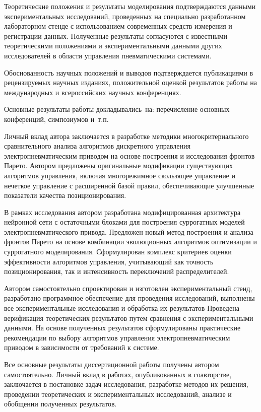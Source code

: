 Теоретические положения и результаты моделирования подтверждаются данными экспериментальных
исследований, проведенных на специально разработанном лабораторном стенде с использованием
современных средств измерения и регистрации данных. Полученные результаты согласуются с известными
теоретическими положениями и экспериментальными данными других исследователей в области управления пневматическими системами.

Обоснованность научных положений и выводов подтверждается публикациями в рецензируемых
научных изданиях, положительной оценкой результатов работы на международных и всероссийских научных конференциях.

{\probation}
Основные результаты работы докладывались~на:
перечисление основных конференций, симпозиумов и~т.\:п.

{\contribution} 
Личный вклад автора заключается в разработке методики многокритериального
сравнительного анализа алгоритмов дискретного управления электропневматическим
приводом на основе построения и исследования фронтов Парето. Автором предложены
оригинальные модификации существующих алгоритмов управления, включая многорежимное
скользящее управление и нечеткое управление с расширенной базой правил, обеспечивающие улучшенные показатели качества позиционирования.

В рамках исследования автором разработана модифицированная архитектура
нейронной сети с остаточными блоками для построения суррогатных моделей электропневматического
привода. Предложен новый метод построения и анализа фронтов Парето на основе комбинации эволюционных
алгоритмов оптимизации и суррогатного моделирования. Сформулирован
комплекс критериев оценки эффективности алгоритмов управления,
учитывающий как точность позиционирования, так и интенсивность переключений распределителей.

Автором самостоятельно спроектирован и изготовлен экспериментальный
стенд, разработано программное обеспечение для проведения исследований,
выполнены все экспериментальные исследования и обработка их результатов
Проведена верификация теоретических результатов путем сравнения с экспериментальными
данными. На основе полученных результатов сформулированы практические рекомендации
по выбору алгоритмов управления электропневматическим приводом в зависимости от требований к системе.

Все основные результаты диссертационной работы получены автором самостоятельно.
Личный вклад в работах, опубликованных в соавторстве, заключается в
постановке задач исследования, разработке методов их решения, проведении
теоретических и экспериментальных исследований, анализе и обобщении полученных результатов.

